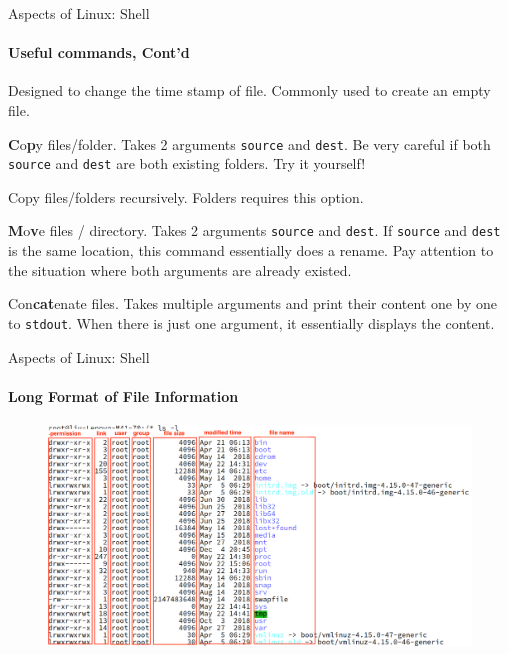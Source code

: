 \begin{frame}{Aspects of Linux: Shell}
\framesubtitle{Useful commands, Cont'd}
\begin{description}[mkdir]
	\item[touch] Designed to change the time stamp of file. Commonly used to create an empty file.
	\item[cp] \textbf{C}o\textbf{p}y files/folder. Takes 2 arguments \texttt{source} and \texttt{dest}. Be very careful if both \texttt{source} and \texttt{dest} are both existing folders. Try it yourself!
	\begin{description}[-]
		\small
		\item[-r] Copy files/folders recursively. Folders requires this option.  
	\end{description}
	\item[mv] \textbf{M}o\textbf{v}e files / directory. Takes 2 arguments \texttt{source} and \texttt{dest}. If \texttt{source} and \texttt{dest} is the same location, this command essentially does a rename. Pay attention to the situation where both arguments are already existed.
	\item[cat] Con\textbf{cat}enate files. Takes multiple arguments and print their content one by one to \texttt{stdout}. When there is just one argument, it essentially displays the content.
\end{description}
\end{frame}


\begin{frame}{Aspects of Linux: Shell}
\framesubtitle{Long Format of File Information}
	\begin{figure}
		\vspace{-0.2in}
		\centering
		\includegraphics[width=1.1\linewidth]{fig/rc2_longformat}
	\end{figure}
\end{frame}

